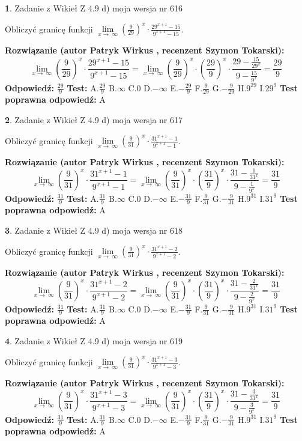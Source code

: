 \documentclass[12pt, a4paper]{article}
\theoremstyle{definition} %
\newtheorem{zad}{}
\newcommand{\zadStart}[1]{\begin{zad}#1\newline}
\newcommand{\zadStop}{\end{zad}}
\newcommand{\rozwStart}[2]{\noindent \textbf{Rozwiązanie (autor #1 , recenzent #2): }\newline}
\newcommand{\rozwStop}{\newline}
\newcommand{\odpStart}{\noindent \textbf{Odpowiedź:}\newline}
\newcommand{\odpStop}{\newline}
\newcommand{\testStart}{\noindent \textbf{Test:}\newline}
\newcommand{\testStop}{\newline}
\newcommand{\kluczStart}{\noindent \textbf{Test poprawna odpowiedź:}\newline}
\newcommand{\kluczStop}{\newline}
\begin{document}
\zadStart{Zadanie z Wikieł Z 4.9 d) moja wersja nr 616}


Obliczyć granicę funkcji  $\lim\limits_{x\to\ \infty}(\frac{9}{29})^{x}\cdot\frac{29^{x+1}-15}{9^{x+1}-15}$.
\zadStop
\rozwStart{Patryk Wirkus}{Szymon Tokarski}
$$\lim\limits_{x\to\ \infty}(\frac{9}{29})^{x}\cdot\frac{29^{x+1}-15}{9^{x+1}-15}=\lim\limits_{x\to\ \infty}(\frac{9}{29})^{x}\cdot(\frac{29}{9})^{x} \cdot \frac{29-\frac{15}{29^{x}}}{9-\frac{15}{9^{x}}} = \frac{29}{9}$$
\rozwStop
\odpStart
$\frac{29}{9}$
\odpStop
\testStart
A.$\frac{29}{9}$ B.$\infty$ C.$0$ D.$-\infty$ E.$-\frac{29}{9}$
F.$\frac{9}{29}$ G.$-\frac{9}{29}$
H.$9^{29}$
I.$29^{9}$
\testStop
\kluczStart
A
\kluczStop



\zadStart{Zadanie z Wikieł Z 4.9 d) moja wersja nr 617}


Obliczyć granicę funkcji  $\lim\limits_{x\to\ \infty}(\frac{9}{31})^{x}\cdot\frac{31^{x+1}-1}{9^{x+1}-1}$.
\zadStop
\rozwStart{Patryk Wirkus}{Szymon Tokarski}
$$\lim\limits_{x\to\ \infty}(\frac{9}{31})^{x}\cdot\frac{31^{x+1}-1}{9^{x+1}-1}=\lim\limits_{x\to\ \infty}(\frac{9}{31})^{x}\cdot(\frac{31}{9})^{x} \cdot \frac{31-\frac{1}{31^{x}}}{9-\frac{1}{9^{x}}} = \frac{31}{9}$$
\rozwStop
\odpStart
$\frac{31}{9}$
\odpStop
\testStart
A.$\frac{31}{9}$ B.$\infty$ C.$0$ D.$-\infty$ E.$-\frac{31}{9}$
F.$\frac{9}{31}$ G.$-\frac{9}{31}$
H.$9^{31}$
I.$31^{9}$
\testStop
\kluczStart
A
\kluczStop



\zadStart{Zadanie z Wikieł Z 4.9 d) moja wersja nr 618}


Obliczyć granicę funkcji  $\lim\limits_{x\to\ \infty}(\frac{9}{31})^{x}\cdot\frac{31^{x+1}-2}{9^{x+1}-2}$.
\zadStop
\rozwStart{Patryk Wirkus}{Szymon Tokarski}
$$\lim\limits_{x\to\ \infty}(\frac{9}{31})^{x}\cdot\frac{31^{x+1}-2}{9^{x+1}-2}=\lim\limits_{x\to\ \infty}(\frac{9}{31})^{x}\cdot(\frac{31}{9})^{x} \cdot \frac{31-\frac{2}{31^{x}}}{9-\frac{2}{9^{x}}} = \frac{31}{9}$$
\rozwStop
\odpStart
$\frac{31}{9}$
\odpStop
\testStart
A.$\frac{31}{9}$ B.$\infty$ C.$0$ D.$-\infty$ E.$-\frac{31}{9}$
F.$\frac{9}{31}$ G.$-\frac{9}{31}$
H.$9^{31}$
I.$31^{9}$
\testStop
\kluczStart
A
\kluczStop



\zadStart{Zadanie z Wikieł Z 4.9 d) moja wersja nr 619}


Obliczyć granicę funkcji  $\lim\limits_{x\to\ \infty}(\frac{9}{31})^{x}\cdot\frac{31^{x+1}-3}{9^{x+1}-3}$.
\zadStop
\rozwStart{Patryk Wirkus}{Szymon Tokarski}
$$\lim\limits_{x\to\ \infty}(\frac{9}{31})^{x}\cdot\frac{31^{x+1}-3}{9^{x+1}-3}=\lim\limits_{x\to\ \infty}(\frac{9}{31})^{x}\cdot(\frac{31}{9})^{x} \cdot \frac{31-\frac{3}{31^{x}}}{9-\frac{3}{9^{x}}} = \frac{31}{9}$$
\rozwStop
\odpStart
$\frac{31}{9}$
\odpStop
\testStart
A.$\frac{31}{9}$ B.$\infty$ C.$0$ D.$-\infty$ E.$-\frac{31}{9}$
F.$\frac{9}{31}$ G.$-\frac{9}{31}$
H.$9^{31}$
I.$31^{9}$
\testStop
\kluczStart
A
\kluczStop
\end{document}
